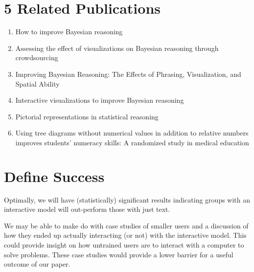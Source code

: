 \documentclass{proc}
\begin{document}
\section{5 Related Publications}
\begin{enumerate}
    \item How to improve Bayesian reasoning \cite{Gigerenzer1995} \item
    Assessing the effect of visualizations on Bayesian reasoning through
    crowdsourcing \cite{Micallef2012} 

    \item Improving Bayesian Reasoning: The
    Effects of Phrasing, Visualization, and Spatial Ability \cite{Ottley2016}
    \item Interactive visualizations to improve Bayesian reasoning
    \cite{Tsai2011} 

    \item Pictorial representations in statistical reasoning
    \cite{Brase2009} 

    \item Using tree diagrams without numerical values in
    addition to relative numbers improves students' numeracy skills: A
    randomized study in medical education \cite{Friederichs2014}

\end{enumerate}

\section{Define Success}

Optimally, we will have (statistically) significant results indicating groups with an interactive
model will out-perform those with just text. 

We may be able to make do with case studies of smaller users and a discussion of how they ended up 
actually interacting (or not) with the interactive model. This could provide insight on how untrained
users are to interact with a computer to solve problems. These case studies would provide a lower barrier for 
a useful outcome of our paper. 



\end{document}

